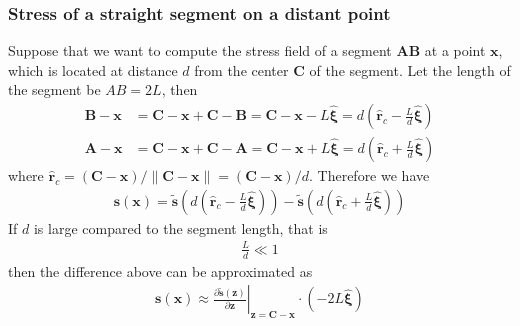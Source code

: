 \subsubsection{Stress of a straight segment on a distant point}
Suppose that we want to compute the stress field of a segment $\bm A\bm B$ at a point $\bm x$, which is located at distance $d$ from the center $\bm C$ of the segment. Let the length of the segment be $AB=2L$, then
\begin{align}
\bm B-\bm x&=\bm C-\bm x+\bm C-\bm B=\bm C-\bm x-L\hat{\bm\xi}=d\left(\hat{\bm r}_c-\frac{L}{d}\hat{\bm\xi}\right)\\
\bm A-\bm x&=\bm C-\bm x+\bm C-\bm A=\bm C-\bm x+L\hat{\bm\xi}=d\left(\hat{\bm r}_c+\frac{L}{d}\hat{\bm\xi}\right)
\end{align}
where $\hat{\bm r}_c=(\bm C-\bm x)/\|\bm C-\bm x\|=(\bm C-\bm x)/d$. Therefore we have
\begin{align}
\bm s(\bm x)=\tilde {\bm s}\left(d\left(\hat{\bm r}_c-\frac{L}{d}\hat{\bm\xi}\right)\right)-
\tilde {\bm s}\left(d\left(\hat{\bm r}_c+\frac{L}{d}\hat{\bm\xi}\right)\right)
\end{align}
If $d$ is large compared to the segment length, that is 
\begin{align}
\frac{L}{d}\ll1
\end{align}
then the difference above can be approximated  as
\begin{align}
\bm s(\bm x)\approx \left.\frac{\partial \tilde {\bm s}(\bm z)}{\partial \bm z}\right|_{\bm z=\bm C-\bm x}\cdot(-2L\hat{\bm \xi})
\end{align}
